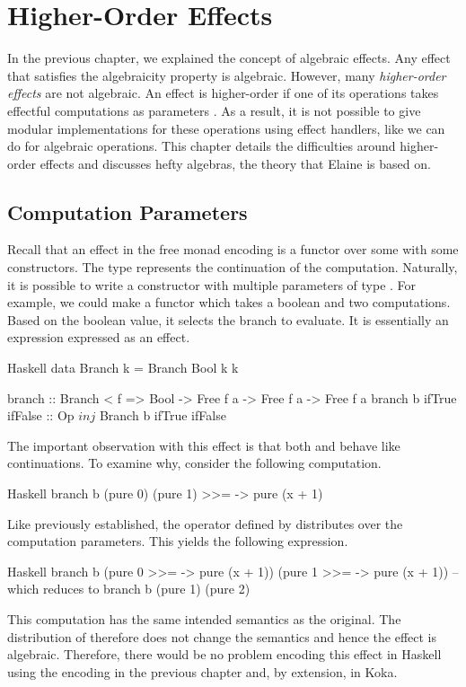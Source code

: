 \chapter{Higher-Order Effects}\label{chap:higher_order}

In the previous chapter, we explained the concept of algebraic effects. Any effect that satisfies the algebraicity property is algebraic. However, many \emph{higher-order effects} are not algebraic. An effect is higher-order if one of its operations takes effectful computations as parameters \autocite{bach_poulsen_hefty_2023}. As a result, it is not possible to give modular implementations for these operations using effect handlers, like we can do for algebraic operations. This chapter details the difficulties around higher-order effects and discusses hefty algebras, the theory that Elaine is based on.

\section{Computation Parameters}

Recall that an effect in the free monad encoding is a functor over some  with some constructors. The type  represents the continuation of the computation. Naturally, it is possible to write a constructor with multiple parameters of type . For example, we could make a  functor which takes a boolean and two computations. Based on the boolean value, it selects the branch to evaluate. It is essentially an  expression expressed as an effect.

\begin{lst}{Haskell}
data Branch k = Branch Bool k k

branch :: Branch < f => Bool -> Free f a -> Free f a -> Free f a
branch b ifTrue ifFalse :: Op $ inj $ Branch b ifTrue ifFalse
\end{lst}
%
The important observation with this effect is that both  and  behave like continuations. To examine why, consider the following computation.

\begin{lst}{Haskell}
branch b (pure 0) (pure 1) >>= \x -> pure (x + 1)
\end{lst}
%
Like previously established, the \hs{>>=} operator defined by  distributes over the computation parameters. This yields the following expression.

\begin{lst}{Haskell}
branch b
  (pure 0 >>= \x -> pure (x + 1))
  (pure 1 >>= \x -> pure (x + 1))
-- which reduces to
branch b (pure 1) (pure 2)
\end{lst}
%
This computation has the same intended semantics as the original. The distribution of \hs{>>=} therefore does not change the semantics and hence the effect is algebraic. Therefore, there would be no problem encoding this effect in Haskell using the encoding in the previous chapter and, by extension, in Koka.

